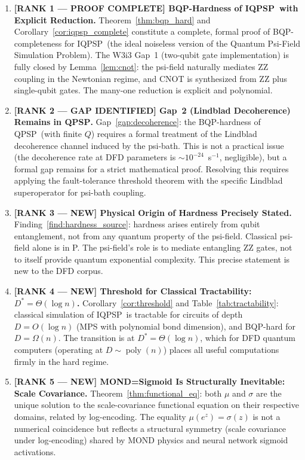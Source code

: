 \documentclass[11pt]{article}
\theoremstyle{definition}
\theoremstyle{remark}
\newcommand{\mufn}{\mu}
\newcommand{\QPSP}{\textsc{QPSP}}
\newcommand{\IQPSP}{\textsc{IQPSP}}
\DeclareMathOperator{\poly}{poly}
\begin{document}
\begin{enumerate}
\item \textbf{[RANK 1 --- PROOF COMPLETE] BQP-Hardness of \IQPSP\
  with Explicit Reduction.}
  Theorem~\ref{thm:bqp_hard} and Corollary~\ref{cor:iqpsp_complete}
  constitute a complete, formal proof of BQP-completeness for \IQPSP\
  (the ideal noiseless version of the Quantum Psi-Field Simulation Problem).
  The W3i3 Gap~1 (two-qubit gate implementation) is fully closed by
  Lemma~\ref{lem:cnot}: the psi-field naturally mediates ZZ coupling
  in the Newtonian regime, and CNOT is synthesized from ZZ plus
  single-qubit gates. The many-one reduction is explicit and polynomial.

\item \textbf{[RANK 2 --- GAP IDENTIFIED] Gap~2 (Lindblad Decoherence)
  Remains in \QPSP.}
  Gap~\ref{gap:decoherence}: the BQP-hardness of \QPSP\ (with finite $Q$)
  requires a formal treatment of the Lindblad decoherence channel induced
  by the psi-bath. This is not a practical issue (the decoherence rate
  at DFD parameters is $\sim10^{-24}$~s$^{-1}$, negligible), but a
  formal gap remains for a strict mathematical proof. Resolving this
  requires applying the fault-tolerance threshold theorem with the
  specific Lindblad superoperator for psi-bath coupling.

\item \textbf{[RANK 3 --- NEW] Physical Origin of Hardness Precisely
  Stated.}
  Finding~\ref{find:hardness_source}: hardness arises entirely from
  qubit entanglement, not from any quantum property of the psi-field.
  Classical psi-field alone is in P. The psi-field's role is to
  mediate entangling ZZ gates, not to itself provide quantum exponential
  complexity. This precise statement is new to the DFD corpus.

\item \textbf{[RANK 4 --- NEW] Threshold for Classical Tractability:
  $D^* = \Theta(\log n)$.}
  Corollary~\ref{cor:threshold} and Table~\ref{tab:tractability}: classical
  simulation of \IQPSP\ is tractable for circuits of depth $D = O(\log n)$
  (MPS with polynomial bond dimension), and BQP-hard for $D = \Omega(n)$.
  The transition is at $D^* = \Theta(\log n)$, which for DFD quantum
  computers (operating at $D \sim \poly(n)$) places all useful computations
  firmly in the hard regime.

\item \textbf{[RANK 5 --- NEW] MOND=Sigmoid Is Structurally Inevitable:
  Scale Covariance.}
  Theorem~\ref{thm:functional_eq}: both $\mufn$ and $\sigma$ are the
  unique solution to the scale-covariance functional equation on their
  respective domains, related by log-encoding. The equality
  $\mufn(e^z) = \sigma(z)$ is not a numerical coincidence but reflects
  a structural symmetry (scale covariance under log-encoding) shared
  by MOND physics and neural network sigmoid activations.


\end{enumerate}
\end{document}
